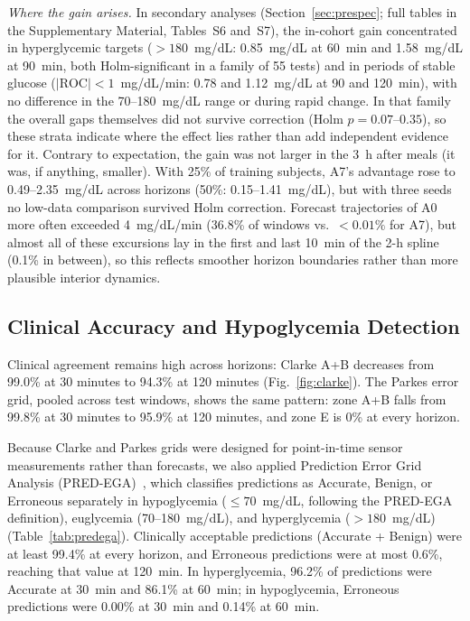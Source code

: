\documentclass[journal]{IEEEtran}
\begin{document}
\textit{Where the gain arises.} In secondary analyses (Section~\ref{sec:prespec}; full tables in the Supplementary Material, Tables~S6 and~S7), the in-cohort gain concentrated in hyperglycemic targets ($>180$~mg/dL: 0.85~mg/dL at 60~min and 1.58~mg/dL at 90~min, both Holm-significant in a family of 55 tests) and in periods of stable glucose ($|\text{ROC}| < 1$~mg/dL/min: 0.78 and 1.12~mg/dL at 90 and 120~min), with no difference in the 70--180~mg/dL range or during rapid change. In that family the overall gaps themselves did not survive correction (Holm $p = 0.07$--$0.35$), so these strata indicate where the effect lies rather than add independent evidence for it. Contrary to expectation, the gain was not larger in the 3~h after meals (it was, if anything, smaller). With 25\% of training subjects, A7's advantage rose to 0.49--2.35~mg/dL across horizons (50\%: 0.15--1.41~mg/dL), but with three seeds no low-data comparison survived Holm correction. Forecast trajectories of A0 more often exceeded 4~mg/dL/min (36.8\% of windows vs.\ $<0.01\%$ for A7), but almost all of these excursions lay in the first and last 10~min of the 2-h spline (0.1\% in between), so this reflects smoother horizon boundaries rather than more plausible interior dynamics.

\subsection{Clinical Accuracy and Hypoglycemia Detection}

Clinical agreement remains high across horizons: Clarke A+B decreases from 99.0\% at 30 minutes to 94.3\% at 120 minutes (Fig.~\ref{fig:clarke}). The Parkes error grid, pooled across test windows, shows the same pattern: zone A+B falls from 99.8\% at 30 minutes to 95.9\% at 120 minutes, and zone E is 0\% at every horizon.

Because Clarke and Parkes grids were designed for point-in-time sensor measurements rather than forecasts, we also applied Prediction Error Grid Analysis (PRED-EGA)~\cite{ref53}, which classifies predictions as Accurate, Benign, or Erroneous separately in hypoglycemia ($\le 70$~mg/dL, following the PRED-EGA definition), euglycemia (70--180~mg/dL), and hyperglycemia ($> 180$~mg/dL) (Table~\ref{tab:predega}). Clinically acceptable predictions (Accurate + Benign) were at least 99.4\% at every horizon, and Erroneous predictions were at most 0.6\%, reaching that value at 120~min. In hyperglycemia, 96.2\% of predictions were Accurate at 30~min and 86.1\% at 60~min; in hypoglycemia, Erroneous predictions were 0.00\% at 30~min and 0.14\% at 60~min.
\end{document}
